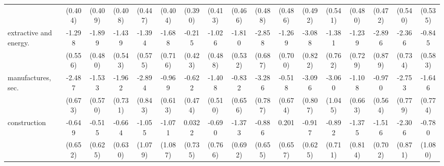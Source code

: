{\begin{tabular}{l*{16}{c}}
                    &     (0.404)         &     (0.409)         &     (0.408)         &     (0.447)         &     (0.404)         &     (0.390)         &     (0.413)         &     (0.466)         &     (0.488)         &     (0.486)         &     (0.492)         &     (0.541)         &     (0.480)         &     (0.472)         &     (0.540)         &     (0.535)         \\
[1em]
extractive and energy.&      -1.298\sym{*}  &      -1.899\sym{***}&      -1.439\sym{**} &      -1.394\sym{*}  &      -1.688\sym{*}  &      -0.215         &      -1.026\sym{*}  &      -1.810\sym{***}&      -2.858\sym{***}&      -1.269         &      -3.088\sym{***}&      -1.381         &      -1.239         &      -2.896\sym{***}&      -2.366\sym{**} &      -0.845         \\
                    &     (0.556)         &     (0.480)         &     (0.543)         &     (0.575)         &     (0.716)         &     (0.423)         &     (0.488)         &     (0.532)         &     (0.687)         &     (0.700)         &     (0.822)         &     (0.762)         &     (0.729)         &     (0.879)         &     (0.734)         &     (0.583)         \\
[1em]
manufactures, sec.  &      -2.487\sym{***}&      -1.533\sym{**} &      -1.962\sym{**} &      -2.894\sym{***}&      -0.969         &      -0.622         &      -1.408\sym{**} &      -0.832         &      -3.286\sym{***}&      -0.518         &      -3.096\sym{***}&      -3.060\sym{**} &      -1.108         &      -0.970         &      -2.753\sym{***}&      -1.646\sym{*}  \\
                    &     (0.673)         &     (0.570)         &     (0.731)         &     (0.843)         &     (0.613)         &     (0.474)         &     (0.510)         &     (0.656)         &     (0.787)         &     (0.674)         &     (0.807)         &     (1.045)         &     (0.663)         &     (0.564)         &     (0.779)         &     (0.774)         \\
[1em]
construction        &      -0.649         &      -0.515         &      -0.664         &      -1.055         &      -1.071         &      0.0322         &      -0.690         &      -1.373\sym{*}  &      -0.886         &       0.201         &      -0.917         &      -0.892         &      -1.375         &      -1.516\sym{*}  &      -2.306\sym{**} &      -0.780         \\
                    &     (0.652)         &     (0.625)         &     (0.630)         &     (1.079)         &     (1.087)         &     (0.735)         &     (0.766)         &     (0.692)         &     (0.655)         &     (0.657)         &     (0.625)         &     (0.711)         &     (0.814)         &     (0.702)         &     (0.871)         &     (1.080)         \\

\end{tabular}}
